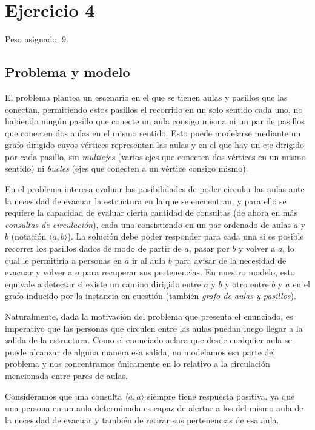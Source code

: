 \section{Ejercicio 4}

Peso asignado: 9.

\subsection{Problema y modelo}

El problema plantea un escenario en el que se tienen aulas y pasillos que las conectan, permitiendo estos pasillos el recorrido en un solo sentido cada uno, no habiendo ningún pasillo que conecte un aula consigo misma ni un par de pasillos que conecten dos aulas en el mismo sentido. Esto puede modelarse mediante un grafo dirigido cuyos vértices representan las aulas y en el que hay un eje dirigido por cada pasillo, sin \textit{multiejes} (varios ejes que conecten dos vértices en un mismo sentido) ni \textit{bucles} (ejes que conecten a un vértice consigo mismo).

En el problema interesa evaluar las posibilidades de poder circular las aulas ante la necesidad de evacuar la estructura en la que se encuentran, y para ello se requiere la capacidad de evaluar cierta cantidad de consultas (de ahora en más \textit{consultas de circulación}), cada una consistiendo en un par ordenado de aulas $a$ y $b$ (notación $\langle a,b \rangle$). La solución debe poder responder para cada una si es posible recorrer los pasillos dados de modo de partir de $a$, pasar por $b$ y volver a $a$, lo cual le permitiría a personas en $a$ ir al aula $b$ para avisar de la necesidad de evacuar y volver a $a$ para recuperar sus pertenencias. En nuestro modelo, esto equivale a detectar si existe un camino dirigido entre $a$ y $b$ y otro entre $b$ y $a$ en el grafo inducido por la instancia en cuestión (también \textit{grafo de aulas y pasillos}).

Naturalmente, dada la motivación del problema que presenta el enunciado, es imperativo que las personas que circulen entre las aulas puedan luego llegar a la salida de la estructura. Como el enunciado aclara que desde cualquier aula se puede alcanzar de alguna manera esa salida, no modelamos esa parte del problema y nos concentramos únicamente en lo relativo a la circulación mencionada entre pares de aulas.

Consideramos que una consulta $\langle a,a \rangle$ siempre tiene respuesta positiva, ya que una persona en un aula determinada es capaz de alertar a los del mismo aula de la necesidad de evacuar y también de retirar sus pertenencias de esa aula.

